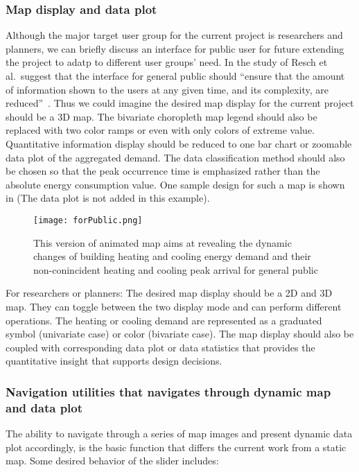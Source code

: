 \subsubsection{Map display and data plot}
Although the major target user group for the current project is
researchers and planners, we can briefly discuss an interface for
public user for future extending the project to adatp to different
user groups' need. In the study of Resch et al.\ suggest that the
interface for general public should ``ensure that the amount of
information shown to the users at any given time, and its complexity,
are reduced''~\cite{Resch2014}. Thus we could imagine the desired map
display for the current project should be a 3D map. The bivariate
choropleth map legend should also be replaced with two color ramps or
even with only colors of extreme value. Quantitative information
display should be reduced to one bar chart or zoomable data plot of
the aggregated demand. The data classification method should also be
chosen so that the peak occurrence time is emphasized rather than the
absolute energy consumption value. One sample design for such a map is
shown in  (The data plot is not added in this
example).

  \begin{figure}[h!]
    \centering
    \texttt{[image: forPublic.png]}
    \caption[Animated Map for Public]{This version of animated map
      aims at revealing the dynamic changes of building heating and
      cooling energy demand and their non-conincident heating and
      cooling peak arrival for general public}
    \label{fig:forPublic}
  \end{figure}
  
For researchers or planners: The desired map display should be a 2D
and 3D map. They can toggle between the two display mode and can
perform different operations. The heating or cooling demand are
represented as a graduated symbol (univariate case) or color
(bivariate case). The map display should also be coupled with
corresponding data plot or data statistics that provides the
quantitative insight that supports design decisions.

\subsubsection{Navigation utilities that navigates through dynamic map
  and data plot}
The ability to navigate through a series of map images and present
dynamic data plot accordingly, is the basic function that differs
the current work from a static map. Some desired behavior of the
slider includes:

